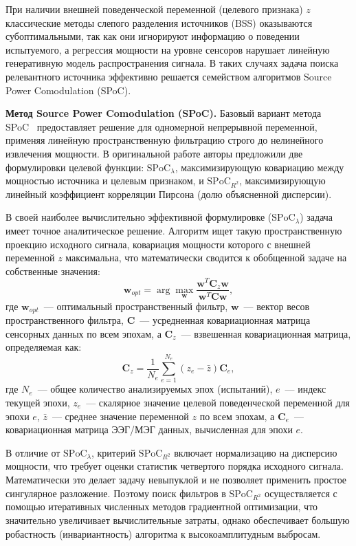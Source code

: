 При наличии внешней поведенческой переменной (целевого признака) $z$ классические методы слепого разделения источников (BSS) оказываются субоптимальными, так как они игнорируют информацию о поведении испытуемого, а регрессия мощности на уровне сенсоров нарушает линейную генеративную модель распространения сигнала. В таких случаях задача поиска релевантного источника эффективно решается семейством алгоритмов Source Power Comodulation (SPoC).

\textbf{Метод Source Power Comodulation (SPoC).} 
Базовый вариант метода SPoC~\cite{dahne2014spoc} предоставляет решение для одномерной непрерывной переменной, применяя линейную пространственную фильтрацию строго до нелинейного извлечения мощности. В оригинальной работе авторы предложили две формулировки целевой функции: $\text{SPoC}_\lambda$, максимизирующую ковариацию между мощностью источника и целевым признаком, и $\text{SPoC}_{R^2}$, максимизирующую линейный коэффициент корреляции Пирсона (долю объясненной дисперсии).

В своей наиболее вычислительно эффективной формулировке ($\text{SPoC}_\lambda$) задача имеет точное аналитическое решение. Алгоритм ищет такую пространственную проекцию исходного сигнала, ковариация мощности которого с внешней переменной $z$ максимальна, что математически сводится к обобщенной задаче на собственные значения:
\begin{equation}
	\mathbf{w}_{opt} = \arg\max_{\mathbf{w}} \frac{\mathbf{w}^T \mathbf{C}_z \mathbf{w}}{\mathbf{w}^T \mathbf{C} \mathbf{w}},
\end{equation}
где $\mathbf{w}_{opt}$~--- оптимальный пространственный фильтр, $\mathbf{w}$~--- вектор весов пространственного фильтра, $\mathbf{C}$~--- усредненная ковариационная матрица сенсорных данных по всем эпохам, а $\mathbf{C}_z$~--- взвешенная ковариационная матрица, определяемая как:
\begin{equation}
	\mathbf{C}_z = \frac{1}{N_e} \sum_{e=1}^{N_e} (z_e - \bar{z}) \mathbf{C}_e,
\end{equation}
где $N_e$~--- общее количество анализируемых эпох (испытаний), $e$~--- индекс текущей эпохи, $z_e$~--- скалярное значение целевой поведенческой переменной для эпохи $e$, $\bar{z}$~--- среднее значение переменной $z$ по всем эпохам, а $\mathbf{C}_e$~--- ковариационная матрица ЭЭГ/МЭГ данных, вычисленная для эпохи $e$.

В отличие от $\text{SPoC}_\lambda$, критерий $\text{SPoC}_{R^2}$ включает нормализацию на дисперсию мощности, что требует оценки статистик четвертого порядка исходного сигнала. Математически это делает задачу невыпуклой и не позволяет применить простое сингулярное разложение. Поэтому поиск фильтров в $\text{SPoC}_{R^2}$ осуществляется с помощью итеративных численных методов градиентной оптимизации, что значительно увеличивает вычислительные затраты, однако обеспечивает большую робастность (инвариантность) алгоритма к высокоамплитудным выбросам.

